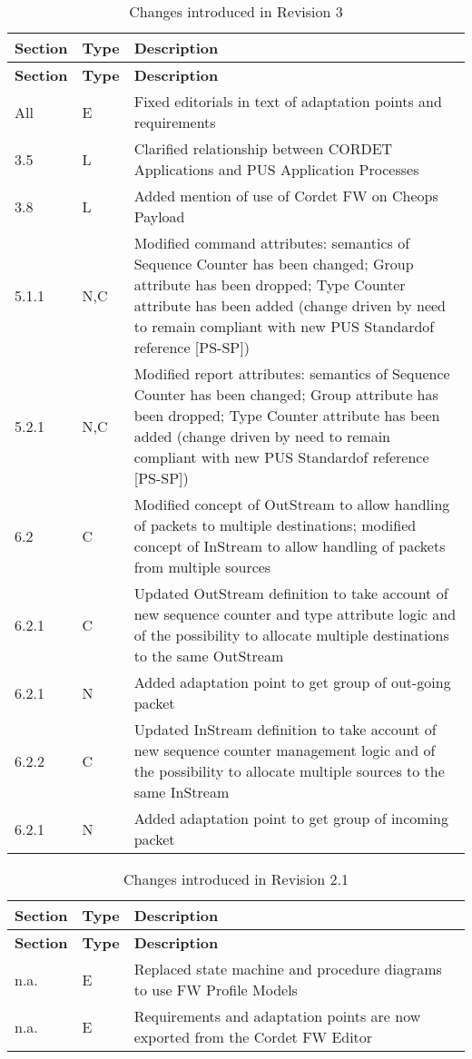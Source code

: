 \documentclass{pnp_article}
\begin{document}
\begin{longtable}{|p{1.5cm}|p{1cm}|p{8cm}|}
\caption{Changes introduced in Revision 3}  \\
\hline
\rowcolor{light-gray}
\textbf{Section} & \textbf{Type} & \textbf{Description} \\
\hline\hline
\endfirsthead
\rowcolor{light-gray}
\textbf{Section} & \textbf{Type} & \textbf{Description} \\
\hline\hline
\endhead
All & E & Fixed editorials in text of adaptation points and requirements \\
\hline
3.5 & L & Clarified relationship between CORDET Applications and PUS Application Processes \\
\hline
3.8 & L & Added mention of use of Cordet FW on Cheops Payload \\
\hline
5.1.1 & N,C & Modified command attributes: semantics of Sequence Counter has been changed; Group attribute has been dropped; Type Counter attribute has been added (change driven by need to remain compliant with new PUS Standardof reference [PS-SP]) \\
\hline
5.2.1 & N,C & Modified report attributes: semantics of Sequence Counter has been changed; Group attribute has been dropped; Type Counter attribute has been added (change driven by need to remain compliant with new PUS Standardof reference [PS-SP]) \\
\hline
6.2 & C & Modified concept of OutStream to allow handling of packets to multiple destinations; modified concept of InStream to allow handling of packets from multiple sources \\
\hline
6.2.1 & C & Updated OutStream definition to take account of new sequence counter and type attribute logic and of the possibility to allocate multiple destinations to the same OutStream \\
\hline
6.2.1 & N & Added adaptation point to get group of out-going packet \\
\hline
6.2.2 & C & Updated InStream definition to take account of new sequence counter management logic and of the possibility to allocate multiple sources to the same InStream \\
\hline
6.2.1 & N & Added adaptation point to get group of incoming packet \\
\hline
\end{longtable}

\begin{longtable}{|p{1.5cm}|p{1cm}|p{8cm}|}
\caption{Changes introduced in Revision 2.1}  \\
\hline
\rowcolor{light-gray}
\textbf{Section} & \textbf{Type} & \textbf{Description} \\
\hline\hline
\endfirsthead
\rowcolor{light-gray}
\textbf{Section} & \textbf{Type} & \textbf{Description} \\
\hline\hline
\endhead
n.a. & E & Replaced state machine and procedure diagrams to use FW Profile Models \\
\hline
n.a. & E & Requirements and adaptation points are now exported from the Cordet FW Editor \\
\hline
\end{longtable}
\end{document}
